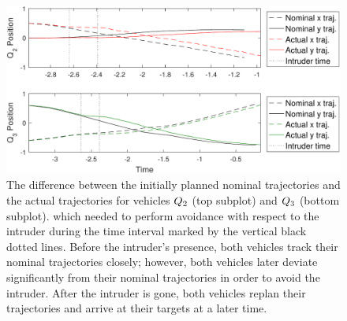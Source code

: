 \begin{figure}[H]
  \centering
  \includegraphics[width=\columnwidth]{"fig/intruder1_diff"}
  \caption{The difference between the initially planned nominal trajectories and the actual trajectories for vehicles $Q_2$ (top subplot) and $Q_3$ (bottom subplot). which needed to perform avoidance with respect to the intruder during the time interval marked by the vertical black dotted lines. Before the intruder's presence, both vehicles track their nominal trajectories closely; however, both vehicles later deviate significantly from their nominal trajectories in order to avoid the intruder. After the intruder is gone, both vehicles replan their trajectories and arrive at their targets at a later time.}
  \label{fig:intruder1_diff}
\end{figure}